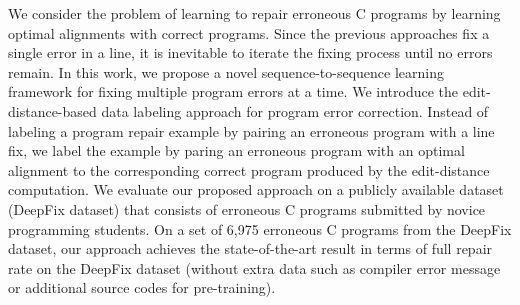 We consider the problem of learning to repair erroneous C programs by learning optimal alignments with correct programs. Since the previous approaches fix a single error in a line, it is inevitable to iterate the fixing process until no errors remain. In this work, we propose a novel sequence-to-sequence learning framework for fixing multiple program errors at a time. We introduce the edit-distance-based data labeling approach for program error correction. Instead of labeling a program repair example by pairing an erroneous program with a line fix, we label the example by paring an erroneous program with an optimal alignment to the corresponding correct program produced by the edit-distance computation. We evaluate our proposed approach on a publicly available dataset (DeepFix dataset) that consists of erroneous C programs submitted by novice programming students. On a set of 6,975 erroneous C programs from the DeepFix dataset, our approach achieves the state-of-the-art result in terms of full repair rate on the DeepFix dataset (without extra data such as compiler error message or additional source codes for pre-training).
